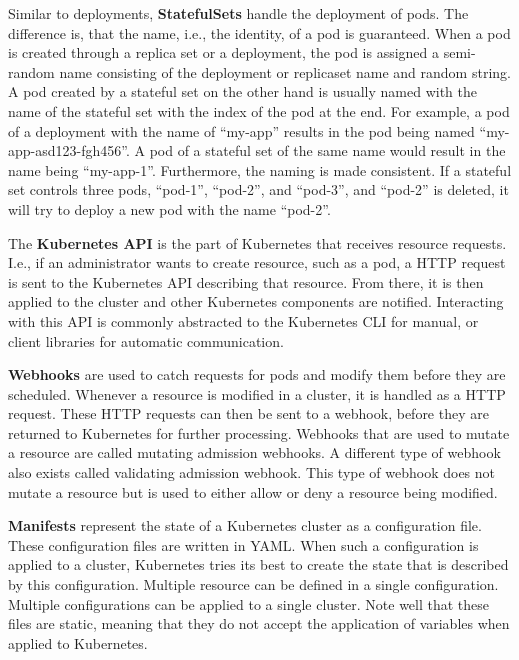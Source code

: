 Similar to deployments, \textbf{StatefulSets}\cite{kubernetes-statefulsets} handle the deployment of pods.
The difference is, that the name, i.e., the identity, of a pod is guaranteed.
When a pod is created through a replica set or a deployment, the pod is assigned a semi-random name consisting of the deployment or replicaset name and random string.
A pod created by a stateful set on the other hand is usually named with the name of the stateful set with the index of the pod at the end.
For example, a pod of a deployment with the name of ``my-app'' results in the pod being named ``my-app-asd123-fgh456''.
A pod of a stateful set of the same name would result in the name being ``my-app-1''.
Furthermore, the naming is made consistent.
If a stateful set controls three pods, ``pod-1'', ``pod-2'', and ``pod-3'', and ``pod-2'' is deleted, it will try to deploy a new pod with the name ``pod-2''.

The \textbf{Kubernetes API}\cite{kubernetes-api} is the part of Kubernetes that receives resource requests.
I.e., if an administrator wants to create resource, such as a pod, a HTTP request is sent to the Kubernetes API describing that resource.
From there, it is then applied to the cluster and other Kubernetes components are notified.
Interacting with this API is commonly abstracted to the Kubernetes CLI for manual, or client libraries for automatic communication.

\textbf{Webhooks}\cite{kubernetes-webhooks} are used to catch requests for pods and modify them before they are scheduled.
Whenever a resource is modified in a cluster, it is handled as a HTTP request.
These HTTP requests can then be sent to a webhook, before they are returned to Kubernetes for further processing.
Webhooks that are used to mutate a resource are called mutating admission webhooks.
A different type of webhook also exists called validating admission webhook.
This type of webhook does not mutate a resource but is used to either allow or deny a resource being modified.

\textbf{Manifests}\cite{kubernetes-manifests} represent the state of a Kubernetes cluster as a configuration file.
These configuration files are written in YAML.
When such a configuration is applied to a cluster, Kubernetes tries its best to create the state that is described by this configuration.
Multiple resource can be defined in a single configuration.
Multiple configurations can be applied to a single cluster.
Note well that these files are static, meaning that they do not accept the application of variables when applied to Kubernetes.

